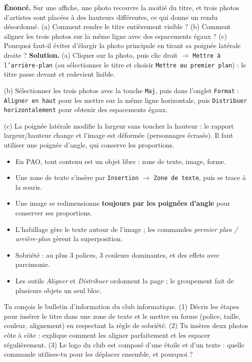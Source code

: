 \documentclass[11pt]{article}
\newcommand{\cle}[1]{{\popxbold\color{popdark}#1}}
\begin{document}
\begin{exoresolu}
\textbf{Énoncé.} Sur une affiche, une photo recouvre la moitié du titre, et trois photos d'artistes sont placées à des hauteurs différentes, ce qui donne un rendu désordonné. (a) Comment rendre le titre entièrement visible ? (b) Comment aligner les trois photos sur la même ligne avec des espacements égaux ? (c) Pourquoi faut-il éviter d'élargir la photo principale en tirant sa poignée latérale droite ?
\tcblower
\textbf{Solution.} (a) Cliquer sur la photo, puis clic droit $\rightarrow$ \texttt{Mettre à l'arrière-plan} (ou sélectionner le titre et choisir \texttt{Mettre au premier plan}) : le titre passe devant et redevient lisible.\par
(b) Sélectionner les trois photos avec la touche \texttt{Maj}, puis dans l'onglet \texttt{Format} : \texttt{Aligner en haut} pour les mettre sur la même ligne horizontale, puis \texttt{Distribuer horizontalement} pour obtenir des espacements égaux.\par
(c) La poignée latérale modifie la largeur sans toucher la hauteur : le rapport largeur/hauteur change et l'image est déformée (personnages écrasés). Il faut utiliser une poignée d'angle, qui conserve les proportions.
\end{exoresolu}

\begin{aretenir}
\begin{itemize}
\item En PAO, tout contenu est un \cle{objet} libre : zone de texte, image, forme.
\item Une zone de texte s'insère par \texttt{Insertion} $\rightarrow$ \texttt{Zone de texte}, puis se trace à la souris.
\item Une image se redimensionne \textbf{toujours par les poignées d'angle} pour conserver ses proportions.
\item L'\cle{habillage} gère le texte autour de l'image ; les commandes \emph{premier plan / arrière-plan} gèrent la superposition.
\item Sobriété : au plus 3 polices, 3 couleurs dominantes, et des effets avec parcimonie.
\item Les outils \emph{Aligner} et \emph{Distribuer} ordonnent la page ; le \cle{groupement} fait de plusieurs objets un seul bloc.
\end{itemize}
\end{aretenir}

\begin{exercice}
Tu conçois le bulletin d'information du club informatique. (1) Décris les étapes pour insérer le titre dans une zone de texte et le mettre en forme (police, taille, couleur, alignement) en respectant la règle de sobriété. (2) Tu insères deux photos côte à côte : explique comment les aligner parfaitement et les espacer régulièrement. (3) Le logo du club est composé d'une étoile et d'un texte : quelle commande utilises-tu pour les déplacer ensemble, et pourquoi ?
\end{exercice}
\end{document}
